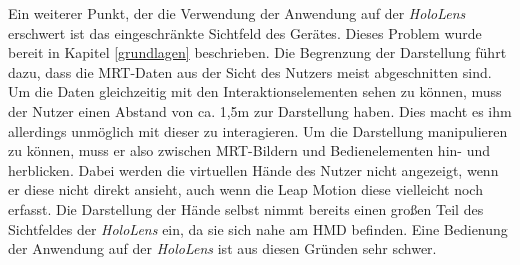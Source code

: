 Ein weiterer Punkt, der die Verwendung der Anwendung auf der \textit{HoloLens} erschwert ist das eingeschränkte Sichtfeld des Gerätes. Dieses Problem wurde bereit in Kapitel \ref{grundlagen} beschrieben. 
Die Begrenzung der Darstellung führt dazu, dass die MRT-Daten aus der Sicht des Nutzers meist abgeschnitten sind. Um die Daten gleichzeitig mit den Interaktionselementen sehen zu können, muss der Nutzer einen Abstand von ca. 1,5m zur Darstellung haben. Dies macht es ihm allerdings unmöglich mit dieser zu interagieren. Um die Darstellung manipulieren zu können, muss er also zwischen MRT-Bildern und Bedienelementen hin- und herblicken. Dabei werden die virtuellen Hände des Nutzer nicht angezeigt, wenn er diese nicht direkt ansieht, auch wenn die Leap Motion diese vielleicht noch erfasst. 
Die Darstellung der Hände selbst nimmt bereits einen großen Teil des Sichtfeldes der \textit{HoloLens} ein, da sie sich nahe am HMD befinden. 
Eine Bedienung der Anwendung auf der \textit{HoloLens} ist aus diesen Gründen sehr schwer. 


